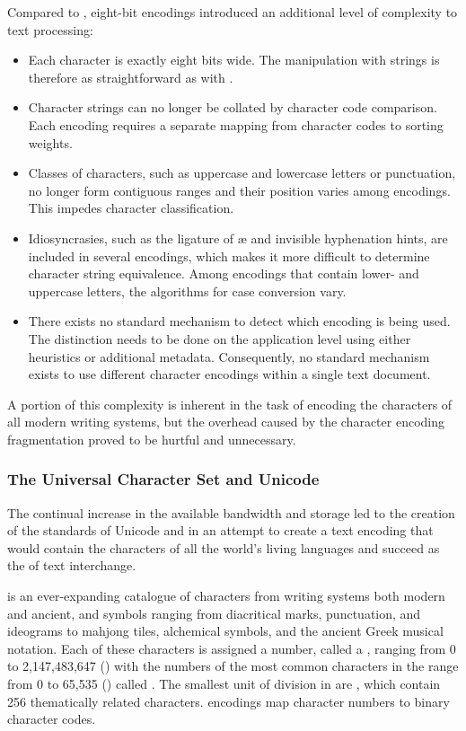 \documentclass[
  a5paper,10pt,           %
  dvipsnames              %
]{book}
\begin{document}
Compared to , eight-bit encodings introduced an additional level
of complexity to text processing:
\begin{itemize}
  \item Each character is exactly eight bits wide. The manipulation with strings
    is therefore as straightforward as with .
  \item Character strings can no longer be collated by character code
    comparison. Each encoding requires a separate mapping from character codes
    to sorting weights.
  \item Classes of characters, such as uppercase and lowercase letters or
    punctuation, no longer form contiguous ranges and their position varies
    among encodings. This impedes character classification.
  \item Idiosyncrasies, such as the ligature of æ and invisible hyphenation
    hints, are included in several encodings, which makes it more difficult to
    determine character string equivalence. Among encodings that contain lower-
    and uppercase letters, the algorithms for case conversion vary.
  \item There exists no standard mechanism to detect which encoding is being
    used. The distinction needs to be done on the application level using either
    heuristics or additional metadata. Consequently, no standard mechanism
    exists to use different character encodings within a single text document.
\end{itemize}
A portion of this complexity is inherent in the task of encoding the characters
of all modern writing systems, but the overhead caused by the character encoding
fragmentation proved to be hurtful and unnecessary.

\subsubsection{The Universal Character Set and Unicode}
The continual increase in the available bandwidth and storage led to the
creation of the standards of Unicode \cite{unicode91,unicode92} and
 in an attempt to create a text encoding that would
contain the characters of all the world's living languages and succeed
 as the  of text interchange.

 is an ever-expanding catalogue of characters from writing systems
both modern and ancient, and symbols ranging from diacritical marks,
punctuation, and ideograms to mahjong tiles, alchemical symbols, and the ancient
Greek musical notation. Each of these characters is assigned a number, called
a , ranging from 0 to 2,147,483,647 () with the
numbers of the most common characters in the range from 0 to 65,535
() called . The smallest unit of division in
 are , which contain 256
thematically related characters.  encodings map character numbers
to binary character codes.
\end{document}
